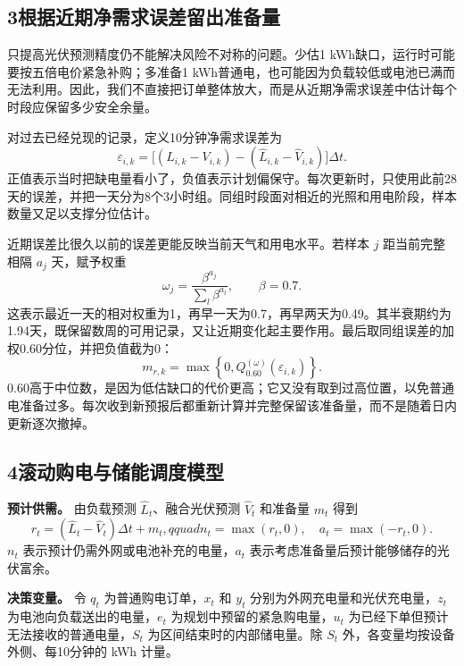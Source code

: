 \documentclass[11pt,a4paper]{article}
\begin{document}
\subsection*{3\quad 根据近期净需求误差留出准备量}

只提高光伏预测精度仍不能解决风险不对称的问题。少估1 kWh缺口，运行时可能要按五倍电价紧急补购；多准备1 kWh普通电，也可能因为负载较低或电池已满而无法利用。因此，我们不直接把订单整体放大，而是从近期净需求误差中估计每个时段应保留多少安全余量。

对过去已经兑现的记录，定义10分钟净需求误差为
\begin{equation}
\varepsilon_{i,k}=
\big[(L_{i,k}-V_{i,k})-(\widehat L_{i,k}-\widehat V_{i,k})\big]\Delta t.
\label{eq:q3-error}
\end{equation}
正值表示当时把缺电量看小了，负值表示计划偏保守。每次更新时，只使用此前28天的误差，并把一天分为8个3小时组。同组时段面对相近的光照和用电阶段，样本数量又足以支撑分位估计。

近期误差比很久以前的误差更能反映当前天气和用电水平。若样本 $j$ 距当前完整相隔 $a_j$ 天，赋予权重
\begin{equation}
\omega_j=\frac{\beta^{a_j}}{\sum_l\beta^{a_l}},\qquad \beta=0.7.
\label{eq:q3-decay}
\end{equation}
这表示最近一天的相对权重为1，再早一天为0.7，再早两天为0.49。其半衰期约为1.94天，既保留数周的可用记录，又让近期变化起主要作用。最后取同组误差的加权0.60分位，并把负值截为0：
\begin{equation}
m_{r,k}=\max\left\{0,Q_{0.60}^{(\omega)}(\varepsilon_{i,k})\right\}.
\label{eq:q3-margin}
\end{equation}
0.60高于中位数，是因为低估缺口的代价更高；它又没有取到过高位置，以免普通电准备过多。每次收到新预报后都重新计算并完整保留该准备量，而不是随着日内更新逐次撤掉。

\subsection*{4\quad 滚动购电与储能调度模型}

\textbf{预计供需。} 由负载预测 $\widehat L_t$、融合光伏预测 $\widehat V_t$ 和准备量 $m_t$ 得到
\begin{equation}
r_t=(\widehat L_t-\widehat V_t)\Delta t+m_t,qquad
n_t=\max(r_t,0),\quad a_t=\max(-r_t,0).
\label{eq:q3-net}
\end{equation}
$n_t$ 表示预计仍需外网或电池补充的电量，$a_t$ 表示考虑准备量后预计能够储存的光伏富余。

\textbf{决策变量。} 令 $q_t$ 为普通购电订单，$x_t$ 和 $y_t$ 分别为外网充电量和光伏充电量，$z_t$ 为电池向负载送出的电量，$e_t$ 为规划中预留的紧急购电量，$u_t$ 为已经下单但预计无法接收的普通电量，$S_t$ 为区间结束时的内部储电量。除 $S_t$ 外，各变量均按设备外侧、每10分钟的 kWh 计量。
\end{document}
